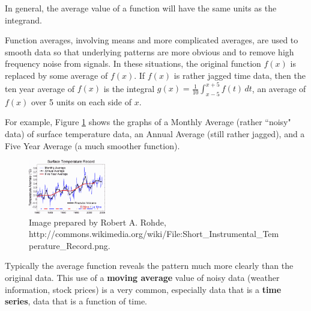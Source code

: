 \begin{note}
In general, the average value of a function will have the same units as the integrand.
\end{note}

Function averages, involving means and more complicated averages, are used to smooth data so that underlying patterns are more obvious and to remove high frequency noise from signals. In these situations, the original function $f(x)$ is replaced by some average of $f(x)$. If $f(x)$ is rather jagged time data, then the ten year average of $f(x)$ is the integral $g(x) = \displaystyle\frac{1}{10}\int_{x-5}^{x+5}f(t)\,dt$, an average of $f(x)$ over 5 units on each side of $x$.

For example, Figure \ref{fig:5-8-temp} shows the graphs of a Monthly Average (rather ``noisy" data) of surface temperature data, an Annual Average (still rather jagged), and a Five Year Average (a much smoother function).

\begin{figure}[!ht]
  \centering
    \includegraphics[width=0.3\textwidth]{img/chap5/image054.png}
    \caption{Image prepared by Robert A. Rohde, http://commons.wikimedia.org/wiki/File:Short\_Instrumental\_Temperature\_Record.png.}
    \label{fig:5-8-temp}
\end{figure}
Typically the average function reveals the pattern much more clearly than the original data. This use of a {\bf moving average} value of noisy data (weather information, stock prices) is a very common, especially data that is a {\bf time series}, data that is a function of time.

